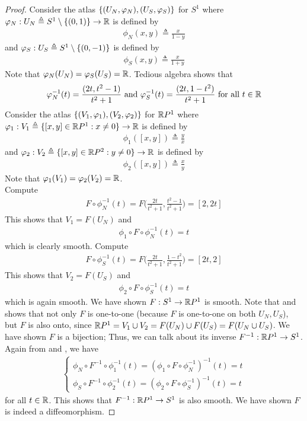 \documentclass{report}
\begin{document}
\begin{proof}
Consider the atlas $\{ (U_N,\varphi_N),(U_S,\varphi_S) \}$ for $S^1$  where $\varphi_N:U_N\triangleq S^1\setminus \{ (0,1) \}\rightarrow \mathbb{R}$ is defined by 
\begin{align*}
\phi_N(x,y)\triangleq  \frac{x}{1-y}
\end{align*}
and $\varphi_S:U_S\triangleq S^1\setminus \{ (0,-1) \}$ is defined by 
\begin{align*}
\phi_S(x,y)\triangleq \frac{x}{1+y}
\end{align*}
Note that $\varphi_N(U_N)=\varphi_S(U_S)=\mathbb{R}$. Tedious algebra shows that 
\begin{align*}
  \varphi_N^{-1}(t)= \frac{(2t,t^2-1)}{t^2+1}\text{ and }\varphi_S^{-1}(t)= \frac{(2t,1-t^2)}{t^2+1}\text{ for all }t\in\mathbb{R}
\end{align*}
Consider the atlas $\{ (V_1,\varphi_1),(V_2,\varphi_2) \}$ for $\mathbb{R} P^1$ where  $\varphi_1: V_1\triangleq \{ [x,y]\in\mathbb{R} P^1:x\neq 0 \}\rightarrow \mathbb{R}$ is defined by 
\begin{align*}
\phi_1 ([x,y])\triangleq \frac{y}{x}
\end{align*}
and $\varphi_2: V_2\triangleq \{ [x,y]\in\mathbb{R} P^2:y\neq 0 \}\rightarrow \mathbb{R}$ is defined by 
\begin{align*}
\phi_2 ([x,y])\triangleq  \frac{x}{y}
\end{align*}
Note that $\varphi_1(V_1)=\varphi_2(V_2)=\mathbb{R}$.\\

Compute 
\begin{align*}
F\circ \phi_N^{-1}(t)=F\Big(\frac{2t}{t^2+1},\frac{t^2-1}{t^2+1}\Big)=[2,2t]
\end{align*}
This shows that $V_1=F(U_N)$ and 
\begin{align}
\label{mi1}
\phi_1\circ F\circ \phi_N^{-1}(t)=t
\end{align}
which is clearly smooth. Compute 
\begin{align*}
F\circ \phi_S^{-1}(t)=F\Big(\frac{2t}{t^2+1}, \frac{1-t^2}{t^2+1} \Big)= [2t,2]
\end{align*}
This shows that $V_2=F(U_S)$ and 
\begin{align}
\label{mi2}
\phi_2\circ F\circ \phi_S^{-1}(t)=t
\end{align}
which is again smooth. We have shown $F:S^1\rightarrow \mathbb{R} P^1$ is smooth. Note that  and  shows that not only $F$ is one-to-one (because $F$ is one-to-one on both $U_N,U_S$), but $F$ is also onto, since $\mathbb{R} P^1=V_1\cup V_2=F(U_N)\cup F(U_S)=F(U_N\cup U_S)$. We have shown $F$ is a bijection; Thus, we can talk about its inverse  $F^{-1}:\mathbb{R} P^1\rightarrow S^1$. Again from  and , we have 
\begin{align*}
\begin{cases}
  \phi_N\circ F^{-1}\circ \phi_1^{-1}(t)=(\phi_1 \circ F\circ \phi_N^{-1})^{-1}(t)=t  \\
 \phi_S \circ F^{-1}\circ \phi_2^{-1}(t)=(\phi_2\circ F \circ \phi_S^{-1})^{-1}(t)=t 
\end{cases}
\end{align*}
for all $t\in\mathbb{R}$. This shows that $F^{-1}:\mathbb{R} P^1\rightarrow S^1$ is also smooth. We have shown $F$ is indeed a diffeomorphism. 
\end{proof}
\end{document}

